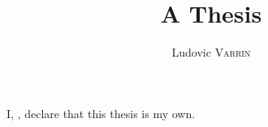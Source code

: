 \documentclass{mdtmini}
\author{Ludovic \textsc{Varrin}}
\title{A Thesis}
\begin{document}
\maketitle
I, \authorname, declare that this thesis is my own.
\end{document}
